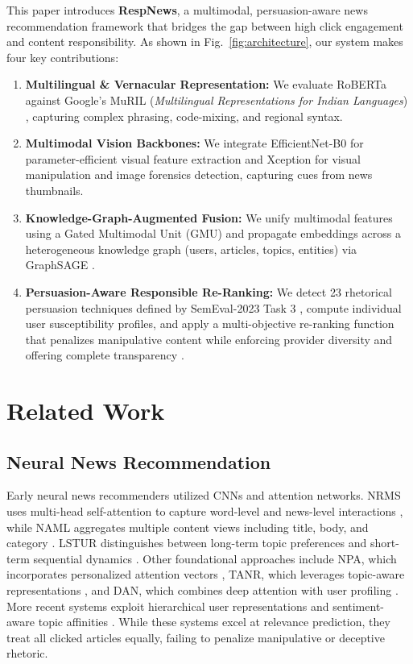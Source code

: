 \documentclass[conference]{IEEEtran}
\begin{document}
This paper introduces \textbf{RespNews}, a multimodal, persuasion-aware news recommendation framework that bridges the gap between high click engagement and content responsibility. As shown in Fig.~\ref{fig:architecture}, our system makes four key contributions:
\begin{enumerate}
    \item \textbf{Multilingual \& Vernacular Representation:} We evaluate RoBERTa \cite{liu_roberta} against Google's MuRIL (\textit{Multilingual Representations for Indian Languages}) \cite{khanuja_muril}, capturing complex phrasing, code-mixing, and regional syntax.
    \item \textbf{Multimodal Vision Backbones:} We integrate EfficientNet-B0 \cite{tan_efficientnet} for parameter-efficient visual feature extraction and Xception \cite{chollet_xception} for visual manipulation and image forensics detection, capturing cues from news thumbnails.
    \item \textbf{Knowledge-Graph-Augmented Fusion:} We unify multimodal features using a Gated Multimodal Unit (GMU) \cite{arevalo_gmu} and propagate embeddings across a heterogeneous knowledge graph (users, articles, topics, entities) via GraphSAGE \cite{hamilton_graphsage}.
    \item \textbf{Persuasion-Aware Responsible Re-Ranking:} We detect 23 rhetorical persuasion techniques defined by SemEval-2023 Task 3 \cite{piskorski_semeval}, compute individual user susceptibility profiles, and apply a multi-objective re-ranking function that penalizes manipulative content while enforcing provider diversity \cite{li_profai} and offering complete transparency \cite{ribeiro_lime}.
\end{enumerate}

\section{Related Work}
\subsection{Neural News Recommendation}
Early neural news recommenders utilized CNNs and attention networks. NRMS uses multi-head self-attention to capture word-level and news-level interactions \cite{wu_nrms}, while NAML aggregates multiple content views including title, body, and category \cite{wu_naml}. LSTUR distinguishes between long-term topic preferences and short-term sequential dynamics \cite{an_lstur}. Other foundational approaches include NPA, which incorporates personalized attention vectors \cite{wu_npa}, TANR, which leverages topic-aware representations \cite{wu_tanr}, and DAN, which combines deep attention with user profiling \cite{zhu_dan}. More recent systems exploit hierarchical user representations \cite{qi_hierec} and sentiment-aware topic affinities \cite{ge_sentiment}. While these systems excel at relevance prediction, they treat all clicked articles equally, failing to penalize manipulative or deceptive rhetoric.
\end{document}
